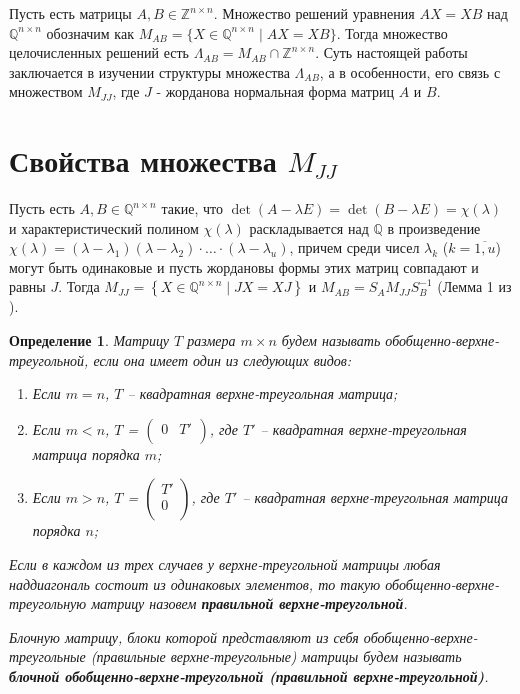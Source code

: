 \documentclass[11pt, a4paper]{article}
\newtheorem{definition}{Определение}
\def\intmat#1#2{\mathbb{Z}^{#1 \times #2}}
\def\ratmat#1#2{\mathbb{Q}^{#1 \times #2}}
\def\newsection#1{
    \newpage
    \section*{#1}
    \addcontentsline{toc}{section}{#1}
}
\begin{document}
\setcounter{page}{1}

Пусть есть матрицы $A, B \in \intmat{n}{n}$. Множество решений уравнения $AX = XB$ над $\ratmat{n}{n}$ 
обозначим как $M_{AB} = \{X\in \ratmat{n}{n}\;|\;  AX = XB \}$. Тогда множество целочисленных решений есть $\Lambda_{AB} = M_{AB} \cap \intmat{n}{n}$.
Суть настоящей работы заключается в изучении структуры множества $\Lambda_{AB}$, а в особенности, его связь с множеством $M_{JJ}$, где 
$J$ - жорданова нормальная форма матриц $A$ и $B$.

\newsection{Свойства множества $M_{JJ}$}

Пусть есть $A, B \in \ratmat{n}{n}$ такие, что $\det(A - \lambda E) = \det(B - \lambda E) = \chi(\lambda)$ и характеристический полином $\chi(\lambda)$
раскладывается над $\mathbb{Q}$ в произведение $\chi(\lambda) = (\lambda - \lambda_1)(\lambda - \lambda_2)\cdot\ldots\cdot(\lambda - \lambda_u)$, причем среди чисел $\lambda_k$ ($k=\overline{1,u}$)
могут быть одинаковые и пусть жордановы формы этих матриц совпадают и равны $J$. Тогда $M_{JJ} = \left\{X \in \ratmat{n}{n}\; | \; JX = XJ \right\}$ и 
$M_{AB} = S_AM_{JJ}S_B^{-1}$ (Лемма 1 из \cite{Sidorov1}).

\begin{definition} \label{def:1}
    Матрицу $T$ размера $m \times n$ будем называть обобщенно-верхне-треугольной, если она имеет один из следующих видов:
    \begin{enumerate}[label={\arabic*)}]
        \item Если $m = n$, $T$ -- квадратная верхне-треугольная матрица;
        \item Если $m < n$, $T$ = $\left(\begin{matrix}
            0 & T'\\
        \end{matrix}\right)$, где $T'$ -- квадратная верхне-треугольная матрица порядка $m$;
        \item Если $m > n$, $T$ = $\left(\begin{matrix}
            T'\\
            0\\
        \end{matrix}\right)$, где $T'$ -- квадратная верхне-треугольная матрица порядка $n$;
    \end{enumerate}

    Если в каждом из трех случаев у верхне-треугольной матрицы любая наддиагональ состоит из одинаковых элементов, то такую 
    обобщенно-верхне-треугольную матрицу назовем \textbf{правильной верхне-треугольной}.

    Блочную матрицу, блоки которой представляют из себя обобщенно-верхне-треугольные (правильные верхне-треугольные) 
    матрицы будем называть \textbf{блочной обобщенно-верхне-треугольной (правильной верхне-треугольной)}.
\end{definition}
\end{document}
